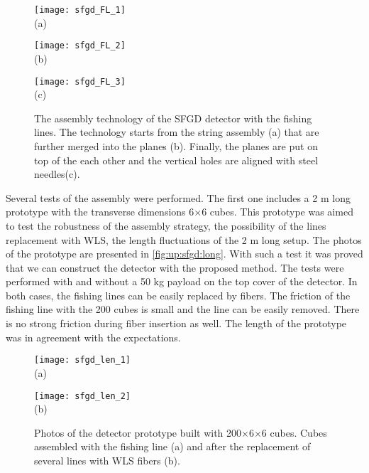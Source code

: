\documentclass[main.tex]{subfiles}
\begin{document}
\begin{figure}[!ht]
	\centering
  \begin{minipage}{0.33\linewidth}
    \centering
    \texttt{[image: sfgd\_FL\_1]} \\ (a)
  \end{minipage}
  \begin{minipage}{0.33\linewidth}
    \centering
    \texttt{[image: sfgd\_FL\_2]} \\ (b)
  \end{minipage}
  \begin{minipage}{0.33\linewidth}
    \centering
    \texttt{[image: sfgd\_FL\_3]} \\ (c)
  \end{minipage}
  \caption{The assembly technology of the SFGD detector with the fishing lines. The technology starts from the string assembly (a) that are further merged into the planes (b). Finally, the planes are put on top of the each other and the vertical holes are aligned with steel needles(c).}
  \label{fig:up:sfgd:string}
\end{figure}

Several tests of the assembly were performed. The first one includes a 2 m long prototype with the transverse dimensions 6$\times$6 cubes. This prototype was aimed to test the robustness of the assembly strategy, the possibility of the lines replacement with WLS, the length fluctuations of the 2 m long setup. The photos of the prototype are presented in \autoref{fig:up:sfgd:long}. With such a test it was proved that we can construct the detector with the proposed method. The tests were performed with and without a 50 kg payload on the top cover of the detector. In both cases, the fishing lines can be easily replaced by fibers. The friction of the fishing line with the 200 cubes is small and the line can be easily removed. There is no strong friction during fiber insertion as well. The length of the prototype was in agreement with the expectations.

\begin{figure}[!ht]
	\centering
  \begin{minipage}{0.49\linewidth}
    \centering
    \texttt{[image: sfgd\_len\_1]} \\ (a)
  \end{minipage}
  \begin{minipage}{0.49\linewidth}
    \centering
    \texttt{[image: sfgd\_len\_2]} \\ (b)
  \end{minipage}
  \caption{Photos of the detector prototype built with 200$\times$6$\times$6 cubes. Cubes assembled with the fishing line (a) and after the replacement of several lines with WLS fibers (b).}
  \label{fig:up:sfgd:long}
\end{figure}
\end{document}
